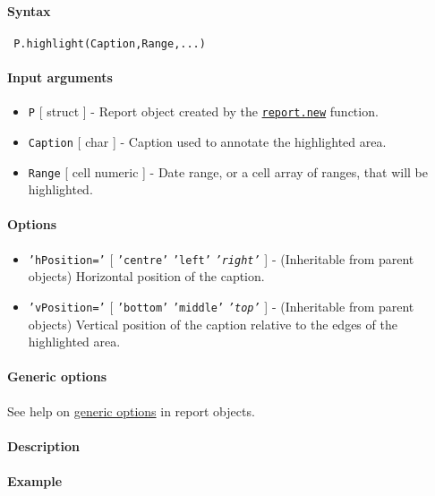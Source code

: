 


	\paragraph{Syntax}
 
 \begin{verbatim}
 P.highlight(Caption,Range,...)
 \end{verbatim}
 
 \paragraph{Input arguments}
 
 \begin{itemize}
 \item
   \texttt{P} {[} struct {]} - Report object created by the
   \href{report/new}{\texttt{report.new}} function.
 \item
   \texttt{Caption} {[} char {]} - Caption used to annotate the
   highlighted area.
 \item
   \texttt{Range} {[} cell \textbar{} numeric {]} - Date range, or a cell
   array of ranges, that will be highlighted.
 \end{itemize}
 
 \paragraph{Options}
 
 \begin{itemize}
 \item
   \texttt{'hPosition='} {[} \texttt{'centre'} \textbar{} \texttt{'left'}
   \textbar{} \emph{\texttt{'right'}} {]} - (Inheritable from parent
   objects) Horizontal position of the caption.
 \item
   \texttt{'vPosition='} {[} \texttt{'bottom'} \textbar{}
   \texttt{'middle'} \textbar{} \emph{\texttt{'top'}} {]} - (Inheritable
   from parent objects) Vertical position of the caption relative to the
   edges of the highlighted area.
 \end{itemize}
 
 \paragraph{Generic options}
 
 See help on \href{report/Contents}{generic options} in report objects.
 
 \paragraph{Description}
 
 \paragraph{Example}


